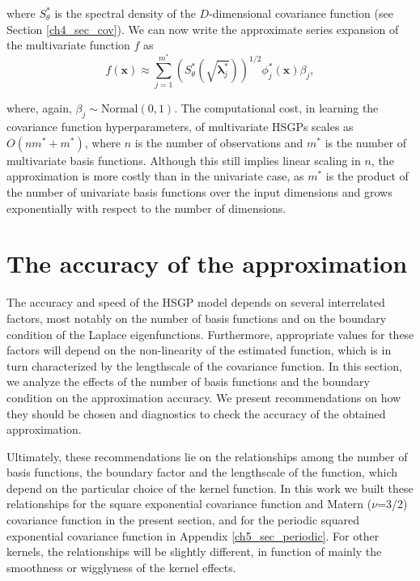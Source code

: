 \documentclass[onecolumn,a4paper,11pt]{article}
\begin{document}
\noindent where $S^{\ast}_{\theta}$ is the spectral density of the $D$-dimensional covariance function (see Section \ref{ch4_sec_cov}). We can now write the approximate series expansion of the multivariate function $f$ as
%
\begin{equation}\label{eq_approxf_multi}
f(\bm{x}) \approx \sum_{j=1}^{m^{\ast}} 
\left( S^{\ast}_{\theta} \left(\sqrt{\bm{\lambda}^{\ast}_j} \right)\right)^{1/2}
\phi^{\ast}_j(\bm{x}) \beta_j, 
\end{equation}

\noindent where, again, $\beta_j \sim \text{Normal}(0,1)$. The computational cost, in learning the covariance function hyperparameters, of multivariate HSGPs scales as $O(n m^{\ast} + m^{\ast})$, where $n$ is the number of observations and $m^{\ast}$ is the number of multivariate basis functions. Although this still implies linear scaling in $n$, the approximation is more costly than in the univariate case, as $m^{\ast}$ is the product of the number of univariate basis functions over the input dimensions and grows exponentially with respect to the number of  dimensions.


\section{The accuracy of the approximation}\label{ch5_sec_accuracy}

The accuracy and speed of the HSGP model depends on several interrelated factors, most notably on the number of basis functions and on the boundary condition of the Laplace eigenfunctions. Furthermore, appropriate values for these factors will depend on the non-linearity of the estimated function, which is in turn characterized by the lengthscale of the covariance function.
In this section, we analyze the effects of the number of basis functions and the boundary condition on the approximation accuracy. We present recommendations on how they should be chosen and diagnostics to check the accuracy of the obtained approximation. 

Ultimately, these recommendations lie on the relationships among the number of basis functions, the boundary factor and the lengthscale of the function, which depend on the particular choice of the kernel function. In this work we built these relationships for the square exponential covariance function and Matern ($\nu$=3/2) covariance function in the present section, and for the periodic squared exponential covariance function in Appendix \ref{ch5_sec_periodic}. For other kernels, the relationships will be slightly different, in function of mainly the smoothness or wigglyness of the kernel effects.
\end{document}

